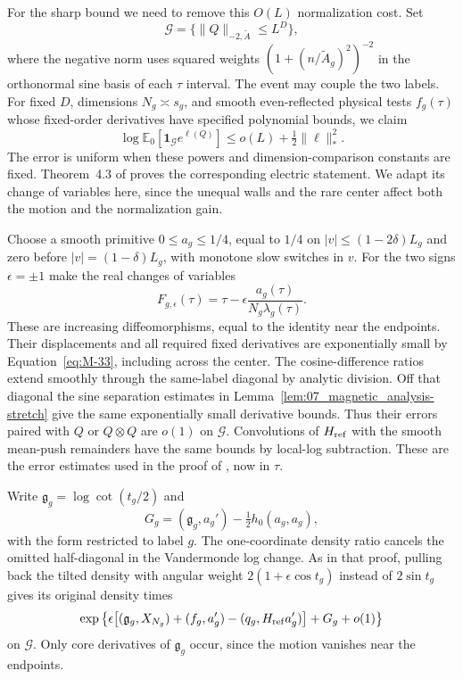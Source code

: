 For the sharp bound we need to remove this $O(L)$ normalization cost.
Set
\[
 \mathcal G=\{\|Q\|_{-2,\widetilde A}\le L^D\},
\]
where the negative norm uses squared weights
$(1+(n/\widetilde A_g)^2)^{-2}$ in the orthonormal sine basis of
each $\tau$ interval. The event may couple the two labels.
For fixed $D$, dimensions $N_g\asymp s_g$, and smooth even-reflected
physical tests $f_g(\tau)$ whose fixed-order derivatives have specified
polynomial bounds, we claim
\begin{equation}\label{eq:G-14}
 \log\mathbb E_0[\mathbf1_{\mathcal G}e^{\ell(Q)}]
 \le o(L)+\tfrac12\|\ell\|_*^2.
\end{equation}
The error is uniform when these powers and dimension-comparison
constants are fixed. Theorem~4.3 of \cite{Electric} proves the
corresponding electric statement. We adapt its change of variables
here, since the unequal walls and the rare center affect both the
motion and the normalization gain.

Choose a smooth primitive $0\le a_g\le1/4$, equal to $1/4$ on
$|v|\le(1-2\delta)L_g$ and zero before
$|v|=(1-\delta)L_g$, with monotone slow switches in $v$. For the two signs
$\epsilon=\pm1$ make the real changes of variables
\[
 F_{g,\epsilon}(\tau)
       =\tau-\epsilon\frac{a_g(\tau)}{N_g\lambda_g(\tau)}.
\]
These are increasing diffeomorphisms, equal to the identity near the
endpoints. Their displacements and all required fixed derivatives are
exponentially small by Equation~\eqref{eq:M-33}, including across the
center. The cosine-difference ratios extend smoothly through the
same-label diagonal by analytic division. Off that diagonal the sine
separation estimates in Lemma~\ref{lem:07_magnetic_analysis-stretch}
give the same exponentially small derivative bounds. Thus their errors
paired with $Q$ or $Q\otimes Q$ are $o(1)$ on $\mathcal G$.
Convolutions of $H_{\rm ref}$ with the smooth mean-push remainders
have the same bounds by local-log subtraction. These are the error
estimates used in the proof of \cite[Theorem~4.3]{Electric}, now in
$\tau$.

Write $\mathfrak g_g=\log\cot(t_g/2)$ and
\[
 G_g=(\mathfrak g_g,a_g')-\tfrac12h_0(a_g,a_g),
\]
with the form restricted to label $g$. The one-coordinate density
ratio cancels the omitted half-diagonal in the Vandermonde log change.
As in that proof, pulling back the tilted density with angular weight
$2(1+\epsilon\cos t_g)$ instead of $2\sin t_g$ gives its original
density times
\[
 \exp\left\{\epsilon\bigl[(\mathfrak g_g,X_{N_g})
          +(f_g,a_g')-(q_g,H_{\rm ref}a_g')\bigr]+G_g+o(1)\right\}
\]
on $\mathcal G$. Only core derivatives of $\mathfrak g_g$ occur,
since the motion vanishes near the endpoints.

